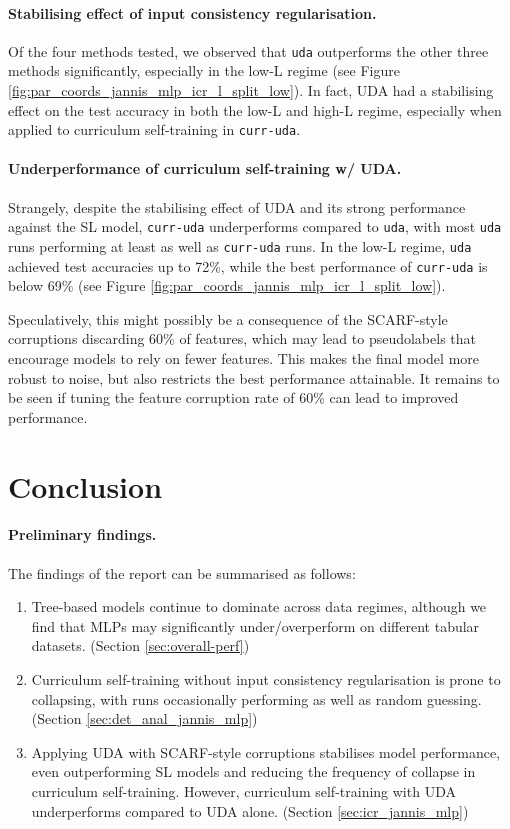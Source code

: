 \documentclass{article}
\begin{document}
\clearpage
\paragraph{Stabilising effect of input consistency regularisation.}
Of the four methods tested, we observed that \texttt{uda} outperforms the other three
methods significantly, especially in the low-L regime (see Figure
\ref{fig:par_coords_jannis_mlp_icr_l_split_low}).
In fact, UDA had a stabilising effect on the test accuracy in both the low-L and high-L
regime, especially when applied to curriculum self-training in \texttt{curr-uda}.

\paragraph{Underperformance of curriculum self-training w/ UDA.}
Strangely, despite the stabilising effect of UDA and its strong performance against
the SL model, \texttt{curr-uda} underperforms compared to \texttt{uda}, with most
\texttt{uda} runs performing at least as well as \texttt{curr-uda} runs.
In the low-L regime, \texttt{uda} achieved test accuracies up to 72\%, while
the best performance of \texttt{curr-uda} is below 69\% (see Figure
\ref{fig:par_coords_jannis_mlp_icr_l_split_low}).

Speculatively, this might possibly be a consequence of the SCARF-style corruptions
discarding 60\% of features, which may lead to pseudolabels that encourage models to
rely on fewer features.
This makes the final model more robust to noise, but also restricts the best performance
attainable.
It remains to be seen if tuning the feature corruption rate of 60\% can lead to improved
performance.

\section{Conclusion}

\paragraph{Preliminary findings.}
The findings of the report can be summarised as follows: \begin{enumerate}
  \item Tree-based models continue to dominate across data regimes, although we find
  that MLPs may significantly under/overperform on different tabular datasets. (Section
  \ref{sec:overall-perf})
  \item Curriculum self-training without input consistency regularisation is prone to
  collapsing, with runs occasionally performing as well as random guessing. (Section
  \ref{sec:det_anal_jannis_mlp})
  \item Applying UDA with SCARF-style corruptions stabilises model performance, even
  outperforming SL models and reducing the frequency of collapse in curriculum
  self-training.
  However, curriculum self-training with UDA underperforms compared to UDA alone.
  (Section \ref{sec:icr_jannis_mlp})
\end{enumerate}
\end{document}
